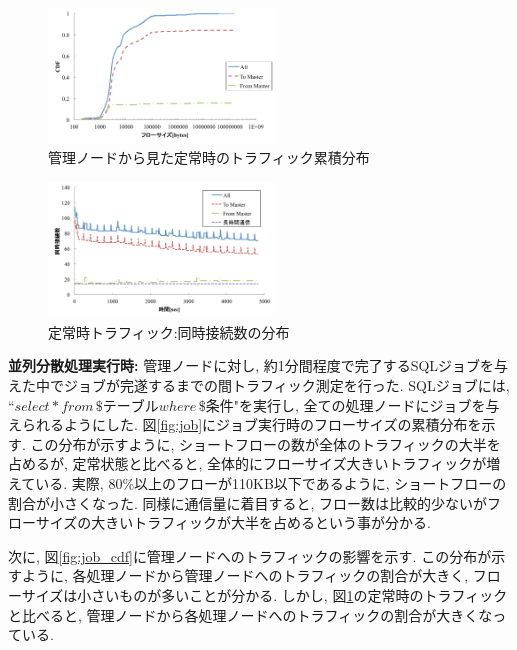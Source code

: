 \documentclass[11pt, a4paper, uplatex]{jsarticle}
\begin{document}
\begin{figure}[t]
    \begin{center}
    \includegraphics[autoebb, width=170pt]{./img/constant_cdf.pdf}
    \caption{管理ノードから見た定常時のトラフィック累積分布}
    \label{fig:constant_cdf}
    \end{center}
\end{figure}

\begin{figure}[t]
    \begin{center}
    \includegraphics[autoebb, width=170pt]{./img/constant_conc.pdf}
    \caption{定常時トラフィック:同時接続数の分布}
    \label{fig:constant_conc}
    \end{center}
\end{figure}

{\bf 並列分散処理実行時: }
管理ノードに対し, 約1分間程度で完了するSQLジョブを与えた中でジョブが完遂するまでの間トラフィック測定を行った.
SQLジョブには, ``$select * from \, \$テーブル where \, \$条件$"を実行し,
全ての処理ノードにジョブを与えられるようにした.
図\ref{fig:job}にジョブ実行時のフローサイズの累積分布を示す.
この分布が示すように, ショートフローの数が全体のトラフィックの大半を占めるが, 定常状態と比べると,
全体的にフローサイズ大きいトラフィックが増えている.
実際, 80\%以上のフローが110KB以下であるように, ショートフローの割合が小さくなった.
同様に通信量に着目すると, フロー数は比較的少ないがフローサイズの大きいトラフィックが大半を占めるという事が分かる.

次に, 図\ref{fig:job_cdf}に管理ノードへのトラフィックの影響を示す.
この分布が示すように, 各処理ノードから管理ノードへのトラフィックの割合が大きく, フローサイズは小さいものが多いことが分かる.
しかし, 図\ref{fig:constant_cdf}の定常時のトラフィックと比べると,
管理ノードから各処理ノードへのトラフィックの割合が大きくなっている.
\end{document}
